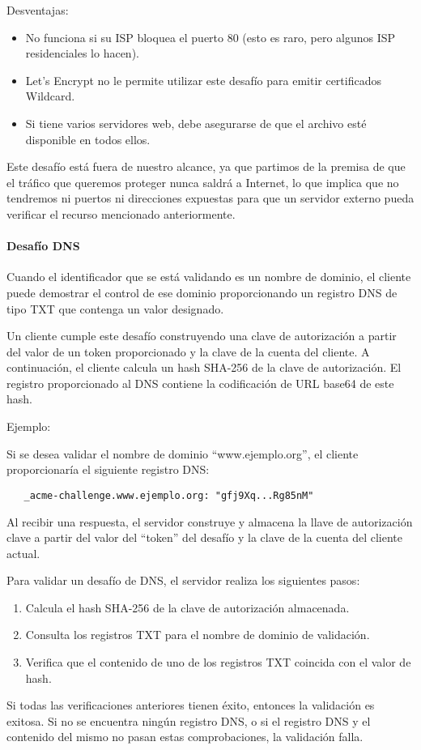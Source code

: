 Desventajas:
\begin{itemize}
   \setlength\itemsep{-0.6em}
   \item No funciona si su ISP bloquea el puerto 80 (esto es raro, pero algunos ISP residenciales lo hacen).
   \item Let's Encrypt no le permite utilizar este desafío para emitir certificados Wildcard.
   \item Si tiene varios servidores web, debe asegurarse de que el archivo esté disponible en todos ellos.
\end{itemize}
   
Este desafío está fuera de nuestro alcance, ya que partimos de la premisa de que 
el tráfico que queremos proteger nunca saldrá a Internet, lo que implica que no 
tendremos ni puertos ni direcciones expuestas para que un servidor externo pueda 
verificar el recurso mencionado anteriormente. 


\paragraph*{Desafío DNS}
Cuando el identificador que se está validando es un nombre de dominio, el cliente 
puede demostrar el control de ese dominio proporcionando un registro DNS de tipo 
TXT que contenga un valor designado.

Un cliente cumple este desafío construyendo una clave de autorización a partir del 
valor de un token proporcionado y la clave de la cuenta del cliente. A continuación, el 
cliente calcula un hash SHA-256 de la clave de 
autorización.
El registro proporcionado al DNS contiene la codificación de URL base64 de este 
hash. 

\noindent Ejemplo:

Si se desea validar el nombre de dominio “www.ejemplo.org”, el cliente 
proporcionaría el siguiente registro DNS:

\begin{verbatim}
   _acme-challenge.www.ejemplo.org: "gfj9Xq...Rg85nM"
\end{verbatim}

Al recibir una respuesta, el servidor construye y almacena la llave de autorización
clave a partir del valor del “token” del desafío y la clave de la cuenta del cliente actual.

\noindent Para validar un desafío de DNS, el servidor realiza los siguientes pasos:

\begin{enumerate}
   \setlength\itemsep{-0.6em}
   \item Calcula el hash SHA-256 de la clave de autorización almacenada.
   \item Consulta los registros TXT para el nombre de dominio de validación.
   \item Verifica que el contenido de uno de los registros TXT coincida con el valor de hash.
\end{enumerate}

   
Si todas las verificaciones anteriores tienen éxito, entonces la validación es exitosa. 
Si no se encuentra ningún registro DNS, o si el registro DNS y el contenido del mismo 
no pasan estas comprobaciones, la validación falla.